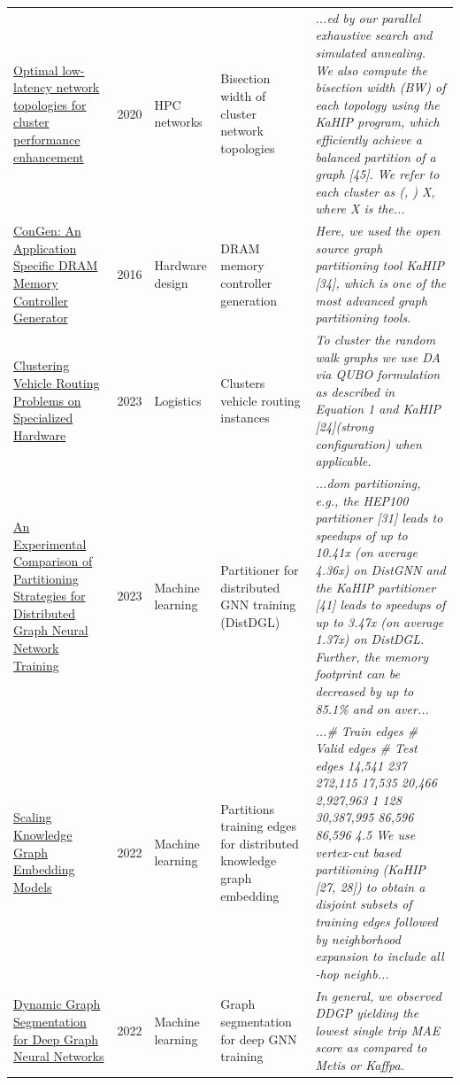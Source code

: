 \documentclass[9pt]{extarticle}
\begin{document}
\begin{longtable}{@{}>{\raggedright}p{6.6cm}r>{\raggedright}p{2.9cm}>{\raggedright}p{4.6cm}>{\raggedright\arraybackslash}p{8.4cm}@{}}
\href{https://doi.org/10.1007/s11227-020-03216-y}{Optimal low-latency network topologies for cluster performance enhancement} & 2020 & HPC networks & Bisection width of cluster network topologies & {\footnotesize\itshape ...ed by our parallel exhaustive search and simulated annealing. We also compute the bisection width (BW) of each topology using the KaHIP program, which efficiently achieve a balanced partition of a graph [45]. We refer to each cluster as (, ) X, where X is the...}\\
\href{https://doi.org/10.1145/2989081.2989131}{ConGen: An Application Specific DRAM Memory Controller Generator} & 2016 & Hardware design & DRAM memory controller generation & {\footnotesize\itshape Here, we used the open source graph partitioning tool KaHIP [34], which is one of the most advanced graph partitioning tools.}\\
\href{https://doi.org/10.1109/ICRC60800.2023.10386156}{Clustering Vehicle Routing Problems on Specialized Hardware} & 2023 & Logistics & Clusters vehicle routing instances & {\footnotesize\itshape To cluster the random walk graphs we use DA via QUBO formulation as described in Equation 1 and KaHIP [24](strong configuration) when applicable.}\\
\href{https://doi.org/10.48786/edbt.2025.14}{An Experimental Comparison of Partitioning Strategies for Distributed Graph Neural Network Training} & 2023 & Machine learning & Partitioner for distributed GNN training (DistDGL) & {\footnotesize\itshape ...dom partitioning, e.g., the HEP100 partitioner [31] leads to speedups of up to 10.41x (on average 4.36x) on DistGNN and the KaHIP partitioner [41] leads to speedups of up to 3.47x (on average 1.37x) on DistDGL. Further, the memory footprint can be decreased by up to 85.1\% and on aver...}\\
\href{https://doi.org/10.48550/arxiv.2201.02791}{Scaling Knowledge Graph Embedding Models} & 2022 & Machine learning & Partitions training edges for distributed knowledge graph embedding & {\footnotesize\itshape ...\# Train edges \# Valid edges \# Test edges 14,541 237 272,115 17,535 20,466 2,927,963 1 128 30,387,995 86,596 86,596 4.5 We use vertex-cut based partitioning (KaHIP [27, 28]) to obtain a disjoint subsets of training edges followed by neighborhood expansion to include all -hop neighb...}\\
\href{https://doi.org/10.1145/3534678.3539111}{Dynamic Graph Segmentation for Deep Graph Neural Networks} & 2022 & Machine learning & Graph segmentation for deep GNN training & {\footnotesize\itshape In general, we observed DDGP yielding the lowest single trip MAE score as compared to Metis or Kaffpa.}\\

\end{longtable}
\end{document}
